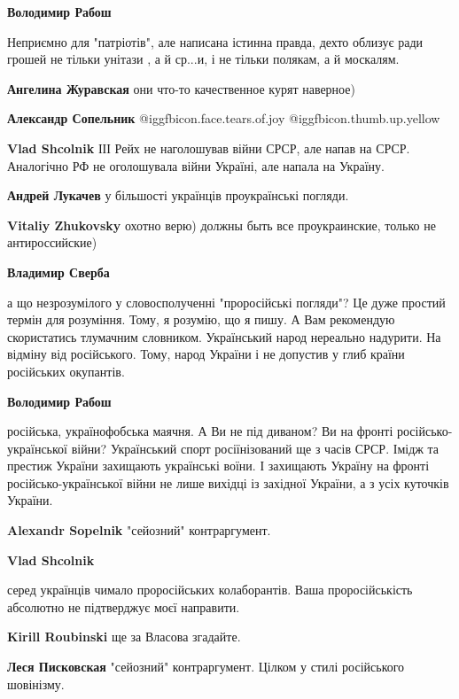 \begin{itemize}
\begin{itemize}
\textbf{Володимир Рабош} 

Неприємно для "патріотів", але написана істинна правда, дехто облизує ради
грошей не тільки унітази , а й ср...и, і не тільки полякам, а й москалям.

\textbf{Ангелина Журавская} они что-то качественное курят наверное)

\textbf{Александр Сопельник}  @igg{fbicon.face.tears.of.joy}  @igg{fbicon.thumb.up.yellow} 

\textbf{Vlad Shcolnik} ІІІ Рейх не наголошував війни СРСР, але напав на СРСР. Аналогічно РФ не оголошувала війни Україні, але напала на Україну.

\textbf{Андрей Лукачев} у більшості українців проукраїнські погляди.

\textbf{Vitaliy Zhukovsky} охотно верю) должны быть все проукраинские, только не антироссийские)

\textbf{Владимир Сверба} 

а що незрозумілого у словосполученні "проросійські погляди"? Це дуже простий
термін для розуміння. Тому, я розумію, що я пишу. А Вам рекомендую скористатись
тлумачним словником. Український народ нереально надурити. На відміну від
російського. Тому, народ України і не допустив у глиб країни російських
окупантів.

\textbf{Володимир Рабош} 

російська, українофобська маячня. А Ви не під диваном? Ви на фронті
російсько-української війни? Український спорт росіїнізований ще з часів СРСР.
Імідж та престиж України захищають українські воїни. І захищають Україну на
фронті російсько-української війни не лише вихідці із західної України, а з
усіх куточків України.

\textbf{Alexandr Sopelnik} "сейозний" контраргумент.

\textbf{Vlad Shcolnik} 

серед українців чимало проросійських колаборантів. Ваша проросійськість
абсолютно не підтверджує моєї направити.

\textbf{Kirill Roubinski} ще за Власова згадайте.

\textbf{Леся Писковская} "сейозний" контраргумент. Цілком у стилі російського шовінізму.


\end{itemize}
\end{itemize}
